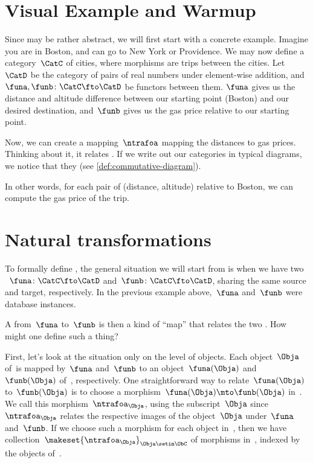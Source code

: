\section{Visual Example and Warmup}
Since  may be rather abstract, we will first start with a concrete example.
Imagine you are in Boston, and can go to New York or Providence.
We may now define a category~$\CatC$ of cities, where morphisms are trips between the cities.
Let~$\CatD$ be the category of pairs of real numbers under element-wise addition, and~$\funa, \funb\colon\CatC\fto\CatD$ be functors between them.
$\funa$ gives us the distance and altitude difference between our starting point (Boston) and our desired destination, and~$\funb$ gives us the gas price relative to our starting point.

Now, we can create a mapping~$\ntrafoa$ mapping the distances to gas prices.
Thinking about it, it relates .
If we write out our categories in typical diagrams, we notice that they  (see \cref{def:commutative-diagram}).


In other words, for each pair of (distance, altitude) relative to Boston, we can compute the gas price of the trip.

\section{Natural transformations}

To formally define , the general situation we will start from is when we have two ~$\funa \colon \CatC \fto \CatD$ and~$\funb \colon \CatC \fto \CatD$, sharing the same source and target, respectively.
In the previous example above,~$\funa$ and~$\funb$ were database instances.

A  from~$\funa$ to~$\funb$ is then a kind of ``map'' that relates the two .
How might one define such a thing?

First, let's look at the situation only on the level of objects.
Each object~$\Obja$ of~\CatC is mapped by~$\funa$ and~$\funb$ to an object~$\funa(\Obja)$ and~$\funb(\Obja)$ of~\CatD, respectively.
One straightforward way to relate~$\funa(\Obja)$ to~$\funb(\Obja)$ is to choose a morphism~$\funa(\Obja) \mto \funb(\Obja)$ in~\CatD.
We call this morphism~$\ntrafoa_{\Obja}$, using the subscript~$\Obja$ since~$\ntrafoa_{\Obja}$ relates the respective images of the object~$\Obja$ under~$\funa$ and~$\funb$.
If we choose such a morphism for each object in~\CatC, then we have collection~$\makeset{ \ntrafoa_\Obja }_{\Obja \setin \ObC}$ of morphisms in~\CatD, indexed by the objects of~\CatC.

